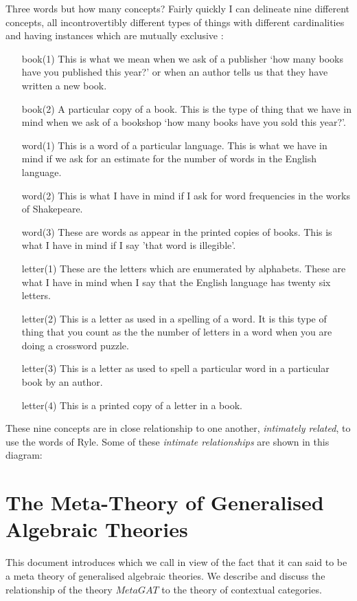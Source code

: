 \documentclass[10pt,a4paper]{article}
\begin{document}
\note 
Three words but how many concepts? Fairly quickly I can delineate nine different concepts, all incontrovertibly 
different types of things with different cardinalities and having instances which are mutually exclusive :
\begin{itemize}
\item [book(1)] This is what we mean when we ask of a publisher `how many books have you published this year?' 
or when an author tells us that they have written a new book.
\item [book(2)] A particular copy of a book. This is the type of thing that we have in mind
 when we ask of a bookshop `how many books have you sold this year?'.
\item [word(1)] This is a word of a particular language. This is what we have in mind if we ask for an estimate for the number of words 
in the English language. 
\item [word(2)] This is what I have in mind if I ask for word frequencies in the works of Shakepeare.   
\item [word(3)] These are words as appear in the printed copies of books. This is what I have in mind if I say 'that word is illegible'.
\item [letter(1)] These are the letters which are enumerated by alphabets. These are what I have in mind when I say that the English language has
twenty six letters.
\item [letter(2)] This is a letter as used in a spelling of a word. It is this type of thing that you count 
as the the number of letters in a word when you are doing a crossword puzzle. 
\item [letter(3)] This is a letter as used to spell a particular word in a particular book by an author. 
\item [letter(4)] This is a printed copy of a letter in a book. 
\end{itemize}

\note
These nine  concepts are in close relationship to one another, \textit{intimately related}, to use the words of Ryle.
Some of these \textit{intimate relationships} are shown in this diagram:
  


\section{The Meta-Theory of Generalised Algebraic Theories}
This document introduces     
which we call  in view of the fact that it can said to be a meta theory of generalised algebraic theories. We describe and discuss the relationship of the theory $MetaGAT$ to the theory of contextual categories.  
\end{document}
